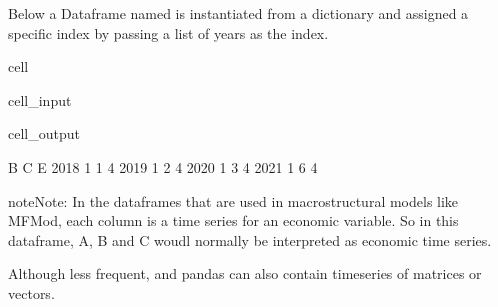 \documentclass[letterpaper,10pt,english]{jupyterBook}
\begin{document}
\sphinxAtStartPar
Below a Dataframe named  is instantiated from a dictionary and assigned a specific index by passing a list of years as the index.

\begin{sphinxuseclass}{cell}\begin{sphinxVerbatimInput}

\begin{sphinxuseclass}{cell_input}
\begin{sphinxVerbatim}[commandchars=\\\{\}]
   \PYG{p}{[}\PYG{p}{]}\PYG{p}{[}\PYG{p}{]}\PYG{p}{[}\PYG{p}{]}\PYG{p}{[}\PYG{p}{]}
\end{sphinxVerbatim}

\end{sphinxuseclass}\end{sphinxVerbatimInput}
\begin{sphinxVerbatimOutput}

\begin{sphinxuseclass}{cell_output}
\begin{sphinxVerbatim}[commandchars=\\\{\}]
      B  C  E
2018  1  1  4
2019  1  2  4
2020  1  3  4
2021  1  6  4
\end{sphinxVerbatim}

\end{sphinxuseclass}\end{sphinxVerbatimOutput}

\end{sphinxuseclass}
\begin{sphinxadmonition}{note}{Note:}
\sphinxAtStartPar
In the dataframes that are used in macrostructural models like MFMod, each  column is a  time series for an economic variable. So in this dataframe,  A, B and C woudl normally be interpreted as economic time series.

\sphinxAtStartPar
Although less frequent,  and pandas can also contain timeseries of matrices or vectors.
\end{sphinxadmonition}
\end{document}
